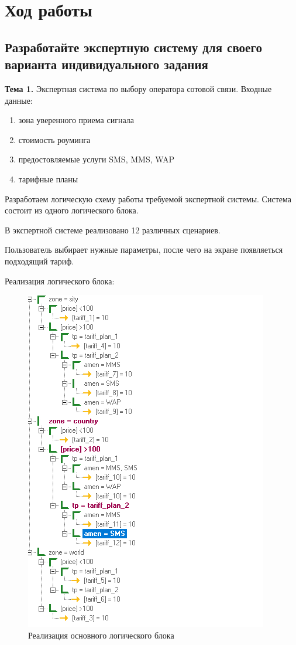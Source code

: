 \documentclass[14pt,a4paper,report]{report}
\begin{document}
\clearpage

\section{Ход работы}

\subsection{Разработайте экспертную систему для своего варианта индивидуального задания}

\textbf{Тема 1.} Экспертная система по выбору оператора сотовой связи. Входные данные:

\begin{enumerate}
	\item зона уверенного приема сигнала
	\item стоимость роуминга
	\item предостовляемые услуги SMS, MMS, WAP
	\item тарифные планы
\end{enumerate}

Разработаем логическую схему работы требуемой экспертной системы. Система состоит из одного логического блока.

В экспертной системе реализовано 12 различных сценариев.

Пользователь выбирает нужные параметры, после чего на экране появляеться подходящий тариф.

Реализация логического блока:

\begin{figure}[h!]
	\centering
	\includegraphics[scale = 0.90]{images/1.png}
	\caption{Реализация основного логического блока}
\end{figure}
\end{document}
